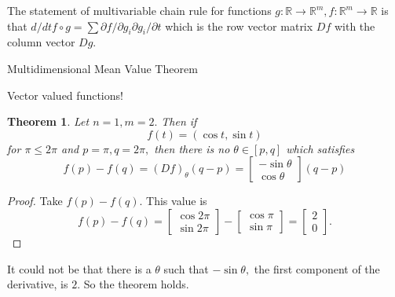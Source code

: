 \documentclass[letter]{article}
\newtheorem{theorem}{Theorem}
\newenvironment{menumerate}{%
  \edef\backupindent{\the\parindent}%
  \enumerate%
  \setlength{\parindent}{\backupindent}%
}{\endenumerate}
\begin{document}
\begin{menumerate}
        The statement of multivariable chain rule for functions $g: \mathbb{R} \to \mathbb{R}^m, f:\mathbb{R}^m \to \mathbb{R}$ is that
        $d/dt f \circ g = \sum \partial f/\partial g_i \partial g_i /\partial t$ which is the row vector
        matrix $Df$ with the column vector $Dg.$
    \item Multidimensional Mean Value Theorem
    \begin{menumerate}
        \item Vector valued functions!
         \begin{theorem}
            Let $n =1, m = 2.$ Then if 
            \begin{equation}
                f(t) = (\cos t, \sin t)
            \end{equation}
            for $\pi \leq 2\pi$ and $p = \pi, q = 2\pi,$ then there is
            no $\theta  \in [p,q]$ which satisfies
            \begin{equation}
                f(p) - f(q) = (Df)_\theta(q-p)= 
                \begin{bmatrix}
                    -\sin \theta \\
                    \cos \theta
                \end{bmatrix}
                (q-p)
            \end{equation}
        \end{theorem}
        \begin{proof}
            Take $f(p) - f(q).$  This value is 
            \begin{equation}
                f(p) - f(q) = 
                \begin{bmatrix}
                    \cos 2\pi\\
                    \sin 2\pi
                \end{bmatrix}
                -
                \begin{bmatrix}
                    \cos \pi \\
                    \sin \pi
                \end{bmatrix}
                = \begin{bmatrix}
                    2 \\
                    0
                \end{bmatrix}.
            \end{equation} 
        \end{proof}
        It could not be that there is a $\theta$ such that $-\sin \theta,$ the first component of the derivative, is $2$. So the theorem holds.

\end{menumerate}
\end{menumerate}
\end{document}
